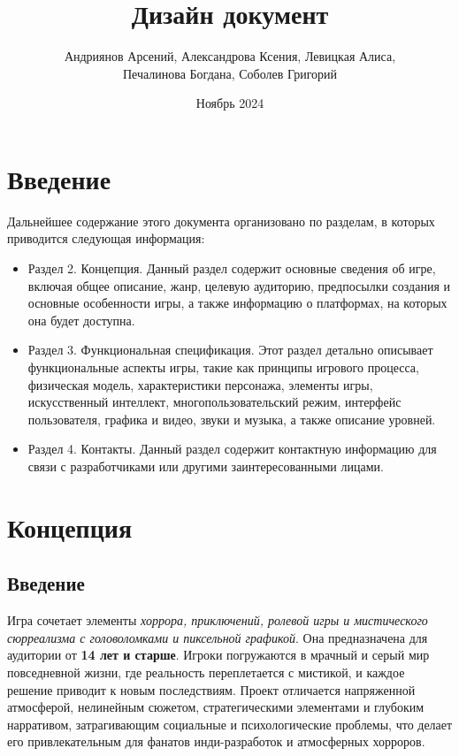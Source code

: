 \documentclass{article}
\title{Дизайн документ}
\author{Андриянов Арсений, Александрова Ксения, Левицкая Алиса, \\ Печалинова Богдана, Соболев Григорий}
\date{Ноябрь 2024}
\begin{document}
	
	\maketitle
	
	\tableofcontents
	
	\newpage
	\section{Введение}
	Дальнейшее содержание этого документа организовано по разделам, в которых приводится следующая информация:
    \begin{itemize}
    \item Раздел 2. Концепция. Данный раздел содержит основные сведения об игре, включая общее описание, жанр, целевую аудиторию, предпосылки создания и основные особенности игры, а также информацию о платформах, на которых она будет доступна.
    \item Раздел 3. Функциональная спецификация. Этот раздел детально описывает функциональные аспекты игры, такие как принципы игрового процесса, физическая модель, характеристики персонажа, элементы игры, искусственный интеллект, многопользовательский режим, интерфейс пользователя, графика и видео, звуки и музыка, а также описание уровней.
    \item Раздел 4. Контакты. Данный раздел содержит контактную информацию для связи с разработчиками или другими заинтересованными лицами.
    \end{itemize}
    
	\newpage
	\section{Концепция}
	
	\subsection{Введение}
	Игра сочетает элементы \textit{хоррора, приключений, ролевой игры и мистического сюрреализма с головоломками и пиксельной графикой}. Она предназначена для аудитории от \textbf{14 лет и старше}. Игроки погружаются в мрачный и серый мир повседневной жизни, где реальность переплетается с мистикой, и каждое решение приводит к новым последствиям. Проект отличается напряженной атмосферой, нелинейным сюжетом, стратегическими элементами и глубоким нарративом, затрагивающим социальные и психологические проблемы, что делает его привлекательным для фанатов инди-разработок и атмосферных хорроров.
    
\end{document}
